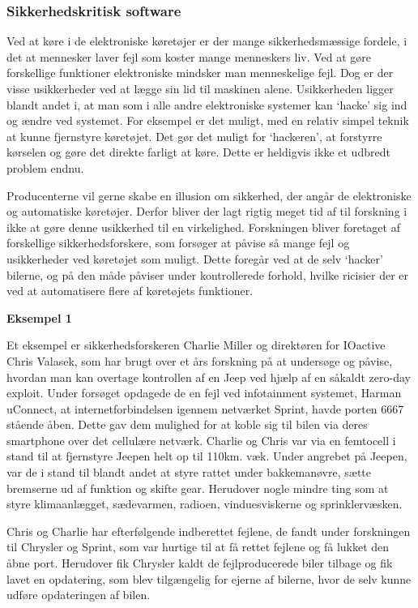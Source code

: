 \subsubsection{Sikkerhedskritisk software}
Ved at køre i de elektroniske køretøjer er der mange sikkerhedsmæssige fordele, i det at mennesker laver fejl som koster mange menneskers liv. Ved at gøre forskellige funktioner elektroniske mindsker man menneskelige fejl. Dog er der visse usikkerheder ved at lægge sin lid til maskinen alene. Usikkerheden ligger blandt andet i, at man som i alle andre elektroniske systemer kan `hacke' sig ind og ændre ved systemet. For eksempel er det muligt, med en relativ simpel teknik at kunne fjernstyre køretøjet. Det gør det muligt for `hackeren', at forstyrre kørselen og gøre det direkte farligt at køre. Dette er heldigvis ikke et udbredt problem endnu.  

Producenterne vil gerne skabe en illusion om sikkerhed, der angår de elektroniske og automatiske køretøjer. Derfor bliver der lagt rigtig meget tid af til forskning i ikke at gøre denne usikkerhed til en virkelighed. Forskningen bliver foretaget af forskellige sikkerhedsforskere, som forsøger at påvise så mange fejl og usikkerheder ved køretøjet som muligt. Dette foregår ved at de selv `hacker' bilerne, og på den måde påviser under kontrollerede forhold, hvilke ricisier der er ved at automatisere flere af køretøjets funktioner.  

\noindent \textbf{Eksempel 1}

Et eksempel er sikkerhedsforskeren Charlie Miller og direktøren for IOactive Chris Valasek, som har brugt over et års forskning på at undersøge og påvise, hvordan man kan overtage kontrollen af en Jeep ved hjælp af en såkaldt zero-day exploit. Under forsøget opdagede de en fejl ved infotainment systemet, Harman uConnect, at internetforbindelsen igennem netværket Sprint, havde porten 6667 stående åben. Dette gav dem mulighed for at koble sig til bilen via deres smartphone over det cellulære netværk. Charlie og Chris var via en femtocell i stand til at fjernstyre Jeepen helt op til 110km. væk. Under angrebet på Jeepen, var de i stand til blandt andet at styre rattet under bakkemanøvre, sætte bremserne ud af funktion og skifte gear. Herudover nogle mindre ting som at styre klimaanlægget, sædevarmen, radioen, vinduesviskerne og sprinklervæsken.  

Chris og Charlie har efterfølgende indberettet fejlene, de fandt under forskningen til Chrysler og Sprint, som var hurtige til at få rettet fejlene og få lukket den åbne port. Herudover fik Chrysler kaldt de fejlproducerede biler tilbage og fik lavet en opdatering, som blev tilgængelig for ejerne af bilerne, hvor de selv kunne udføre opdateringen af bilen.   

